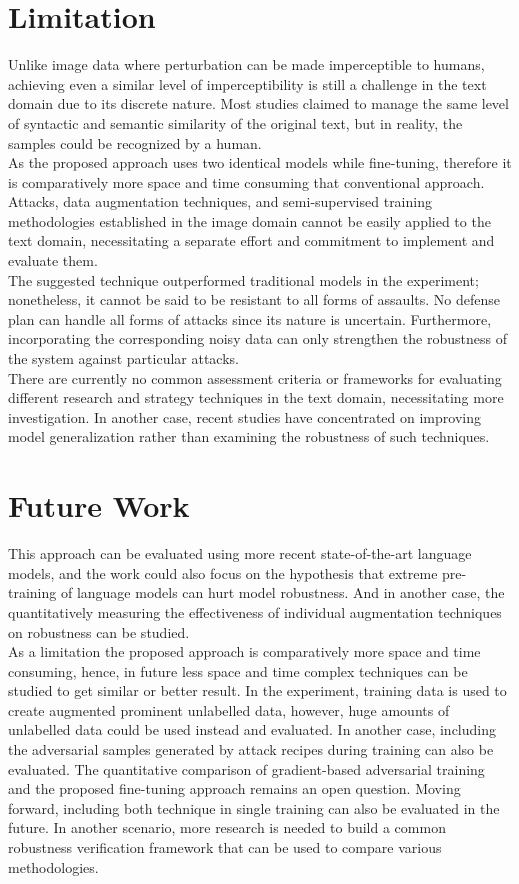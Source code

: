 \documentclass[%
	BCOR=8mm, %
	DIV=12,
	toc=bibliography, %
	toc=listof, %
	oneside, %
	egregdoesnotlikesansseriftitles, %
	]{scrbook}
\begin{document}
\section{Limitation}
\label{section:limitations}
Unlike image data where perturbation can be made imperceptible to humans, achieving even a similar level of imperceptibility is still a challenge in the text domain due to its discrete nature. Most studies claimed to manage the same level of syntactic and semantic similarity of the original text, but in reality, the samples could be recognized by a human.\\
As the proposed approach uses two identical models while fine-tuning, therefore it is comparatively more space and time consuming  that conventional approach. \\
Attacks, data augmentation techniques, and semi-supervised training methodologies established in the image domain cannot be easily applied to the text domain, necessitating a separate effort and commitment to implement and evaluate them.\\
The suggested technique outperformed traditional models in the experiment; nonetheless, it cannot be said to be resistant to all forms of assaults. No defense plan can handle all forms of attacks since its nature is uncertain. Furthermore, incorporating the corresponding noisy data can only strengthen the robustness of the system against particular attacks.\\
There are currently no common assessment criteria or frameworks for evaluating different research and strategy techniques in the text domain, necessitating more investigation. In another case, recent studies have concentrated on improving model generalization rather than examining the robustness of such techniques.
\section{Future Work }
\label{section:futurework}
This approach can be evaluated using more recent state-of-the-art language models, and the work could also focus on the hypothesis that extreme pre-training of language models can hurt model robustness. And in another case, the quantitatively measuring the effectiveness of individual augmentation techniques on robustness can be studied.\\
As a limitation the proposed approach is comparatively more space and time consuming, hence, in future less space and time complex techniques can be studied to get similar or better result. 
In the experiment, training data is used to create augmented prominent unlabelled data, however,  huge amounts of unlabelled data could be used instead and evaluated. In another case, including the adversarial samples generated by attack recipes during training can also be evaluated. The quantitative comparison of gradient-based adversarial training and the proposed fine-tuning approach remains an open question. Moving forward, including both technique in single training can also be evaluated in the future. In another scenario, more research is needed to build a common robustness verification framework that can be used to compare various methodologies.
\end{document}
